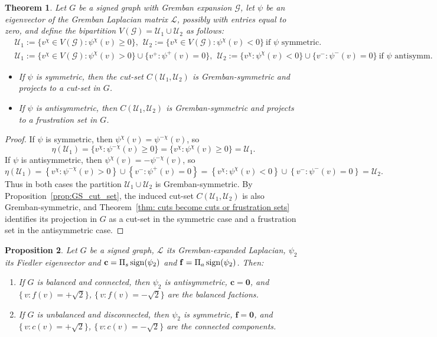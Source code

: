 \documentclass[reprint,onecolumn]{article}
\newtheorem{theorem}{Theorem}[section]
\newtheorem{proposition}[theorem]{Proposition}
\newcommand{\mc}[1]{\mathcal{#1}}
\newcommand{\1}{\mathbb{1}}
\newcommand{\0}{\mathbf{0}}
\begin{document}
\begin{theorem}
\label{thm:generalized_fiedler_cut_projection}
Let $G$ be a signed graph with Gremban expansion $\mathcal{G}$, let $\psi$ be an eigenvector of the Gremban Laplacian matrix $\mathcal{L}$, possibly with entries equal to zero, and define the bipartition $V(\mathcal{G})=\mathcal{U}_1\cup\mathcal{U}_2$ as follows:
\begin{align*}
   &\mc U_1 := \{ v^\chi \in V(\mc G) : \psi^\chi(v) \geq 0 \}, \ \ \mc U_2 := \{ v^\chi \in V(\mc G) : \psi^\chi(v) < 0 \} \ \text{if $\psi$ symmetric}. \\
   &\mc U_1 := \{ v^\chi \in V(\mc G) : \psi^\chi(v) > 0 \} \cup \{ v^+ : \psi^+(v) = 0 \}, \ \  \mc U_2 := \{ v^\chi : \psi^\chi(v) < 0 \} \cup \{ v^- : \psi^-(v) = 0 \} \ \text{if $\psi$ antisymm}. 
\end{align*}
\begin{itemize}
    \item If $\psi$ is symmetric, then the cut-set $C(\mathcal{U}_1,\mathcal{U}_2)$ is Gremban-symmetric and projects to a cut-set in $G$. 
    \item If $\psi$ is antisymmetric, then $C(\mathcal{U}_1,\mathcal{U}_2)$ is Gremban-symmetric and projects to a frustration set in $G$.
\end{itemize}
\end{theorem}

\begin{proof}
If $\psi$ is symmetric, then $\psi^{\chi}(v)=\psi^{-\chi}(v)$, so
\[\eta(\mc U_1)=\{v^\chi:\psi^{-\chi}(v)\geq 0\} = \{v^\chi:\psi^{\chi}(v)\geq 0\} = \mc U_1.\] 
If $\psi$ is antisymmetric, then $\psi^{\chi}(v)=-\psi^{-\chi}(v)$, so
\[\eta(\mc U_1)=\left\{ v^\chi : \psi^{-\chi}(v) >
   0 \right\} \cup \left\{ v^-  : \psi^+(v) = 0 \right\}=\left\{ v^\chi  : \psi^\chi(v) < 0 \right\} \cup \left\{ v^-  : \psi^-(v) = 0 \right\}=\mc U_2.\]
Thus in both cases the partition $\mc U_1\cup\mc U_2$ is Gremban-symmetric. By Proposition~\ref{prop:GS_cut_set}, the induced cut-set $C(\mc U_1,\mc U_2)$ is also Gremban-symmetric, and Theorem~\ref{thm: cuts become cuts or frustration sets} identifies its projection in $G$ as a cut-set in the symmetric case and a frustration set in the antisymmetric case.
\end{proof}

\begin{proposition} \label{prop:clustering_balanced_connected}
Let $G$ be a signed graph, \(\mc L\) its Gremban-expanded Laplacian, $\psi_2$ its Fiedler eigenvector and $\mathbf{c}=\Pi_s\,\rm{sign}(\psi_2)$ and $\mathbf{f}=\Pi_a\,\rm{sign}(\psi_2)$. Then:
\begin{enumerate}
  \item If \(G\) is balanced and connected, then \(\psi_2\) is antisymmetric, \(\mathbf{c} = \0\), and \(\{\,v : f(v) = +\sqrt{2}\}\), \(\{\,v :  f(v) = -\sqrt{2}\}\) are the balanced factions.
  \item If \(G\) is unbalanced and disconnected, then \(\psi_2\) is symmetric, \(\mathbf{f} = \0\), and \(\{\,v :  c(v) = +\sqrt{2}\}\), \(\{\,v :  c(v) = -\sqrt{2}\}\) are the connected components.
\end{enumerate}
\end{proposition}
\end{document}
